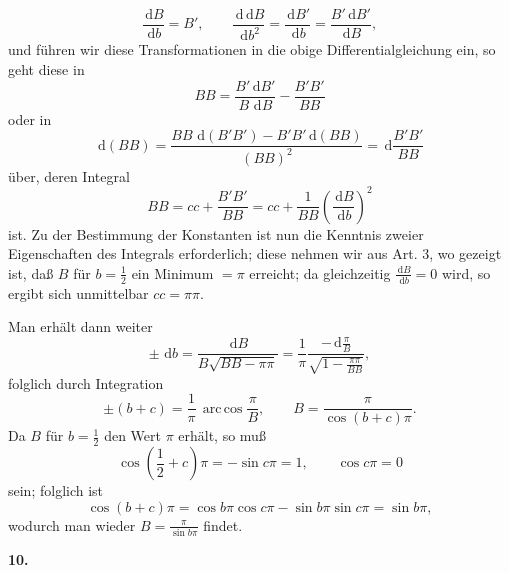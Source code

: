 \documentclass[11pt]{article}
\newcommand{\dd}{\,\mathrm d}
\newcommand{\arccosop}{\operatorname{arc\,cos}}
\newcommand{\art}[1]{\bigskip\begin{center}\large\bfseries #1.\end{center}\nopagebreak}
\begin{document}
\[
\frac{\dd B}{\dd b}=B',\qquad
\frac{\dd\dd B}{\dd b^2}=\frac{\dd B'}{\dd b}
=\frac{B'\dd B'}{\dd B},
\]
und führen wir diese Transformationen in die obige Differentialgleichung ein, so geht diese in
\[
B B=\frac{B'\dd B'}{B\,\dd B}-\frac{B'B'}{B B}
\]
oder in
\[
\dd(BB)=
\frac{BB\,\dd(B'B')-B'B'\dd(BB)}{(BB)^2}
=\dd\frac{B'B'}{BB}
\]
über, deren Integral
\[
BB=cc+\frac{B'B'}{BB}
=cc+\frac1{BB}\left(\frac{\dd B}{\dd b}\right)^2
\]
ist. Zu der Bestimmung der Konstanten ist nun die Kenntnis zweier Eigenschaften des Integrals erforderlich; diese nehmen wir aus Art. 3, wo gezeigt ist, daß $B$ für $b=\frac12$ ein Minimum $=\pi$ erreicht; da gleichzeitig $\frac{\dd B}{\dd b}=0$ wird, so ergibt sich unmittelbar $cc=\pi\pi$.

Man erhält dann weiter
\[
\pm\,\dd b=
\frac{\dd B}{B\sqrt{BB-\pi\pi}}
=\frac1\pi
  \frac{-\dd\frac{\pi}{B}}
       {\sqrt{1-\frac{\pi\pi}{BB}}},
\]
folglich durch Integration
\[
\pm(b+c)=\frac1\pi\,\arccosop\frac{\pi}{B},
\qquad
B=\frac{\pi}{\cos(b+c)\pi}.
\]
Da $B$ für $b=\frac12$ den Wert $\pi$ erhält, so muß
\[
\cos\left(\frac12+c\right)\pi=-\sin c\pi=1,
\qquad \cos c\pi=0
\]
sein; folglich ist
\[
\cos(b+c)\pi=\cos b\pi\cos c\pi-\sin b\pi\sin c\pi=\sin b\pi,
\]
wodurch man wieder $B=\frac{\pi}{\sin b\pi}$ findet.

\art{10}
\end{document}
